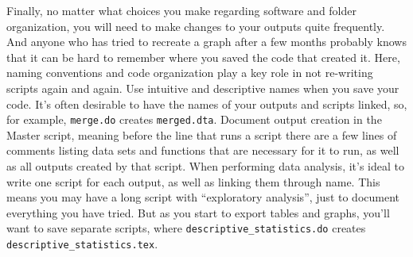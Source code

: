 Finally, no matter what choices you make regarding software and folder organization,
you will need to make changes to your outputs quite frequently.
And anyone who has tried to recreate a graph after a few months probably knows
that it can be hard to remember where you saved the code that created it.
Here, naming conventions and code organization play a key role in not re-writing scripts again and again.
Use intuitive and descriptive names when you save your code.
It's often desirable to have the names of your outputs and scripts linked,
so, for example, \texttt{merge.do} creates \texttt{merged.dta}.
Document output creation in the Master script,
meaning before the line that runs a script there are a few lines of comments listing
data sets and functions that are necessary for it to run,
as well as all outputs created by that script.
When performing data analysis,
it's ideal to write one script for each output,
as well as linking them through name.
This means you may have a long script with ``exploratory analysis'',
just to document everything you have tried.
But as you start to export tables and graphs,
you'll want to save separate scripts, where
\texttt{descriptive\_statistics.do} creates \texttt{descriptive\_statistics.tex}.



